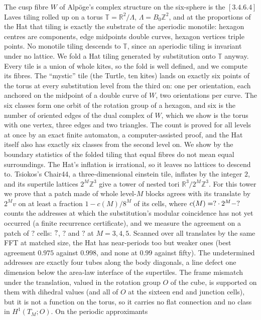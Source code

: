 \documentclass[11pt,a4paper]{article}
\newcommand{\SSChAgreeFive}{?}\newcommand{\SSChAgreeFour}{?}
\newcommand{\SSChCConst}{?}\newcommand{\SSChChecks}{?}
\newcommand{\SSChPatchCells}{?}\newcommand{\SSChRowAddr}{?}
\newcommand{\ZZ}{\mathbb{Z}}
\newcommand{\RR}{\mathbb{R}}
\newcommand{\TT}{\mathbb{T}}
\newcommand{\Lam}{\Lambda}
\theoremstyle{plain}
\theoremstyle{definition}
\begin{document}
The cusp fibre $W$ of Alpöge's complex structure on the six-sphere is the
$[3.4.6.4]$ Laves tiling rolled up on a torus $\TT = \RR^2/\Lam$,
$\Lam = B_0\ZZ^2$, and at the proportions of the Hat that tiling is exactly the
substrate of the aperiodic monotile: hexagon centres are components, edge
midpoints double curves, hexagon vertices triple points. No monotile tiling
descends to $\TT$, since an aperiodic tiling is invariant under no lattice. We
fold a Hat tiling generated by substitution onto $\TT$ anyway. Every tile is a
union of whole kites, so the fold is well defined, and we compute its fibres.
The ``mystic'' tile (the Turtle, ten kites) lands on exactly six points of
the torus at every substitution level from the third on: one per
orientation, each anchored on the midpoint of a double curve of $W$, two
orientations per curve. The six classes form one orbit of the rotation group of
a hexagon, and six is the number of oriented edges of the dual complex of $W$,
which we show is the torus with one vertex, three edges and two triangles. The
count is proved for all levels at once by an exact finite automaton, a
computer-assisted proof, and the Hat itself also has exactly six classes from the
second level on. We show by the boundary statistics of the folded tiling that
equal fibres do not mean equal surroundings. The Hat's inflation is irrational, so it leaves no lattices to descend to.
Tsiokos's Chair44, a three-dimensional einstein tile, inflates by the integer $2$, and
its supertile lattices $2^M\ZZ^3$ give a tower of nested tori $\RR^3/2^M\ZZ^3$. For this
tower we prove that a patch made of whole level-$M$ blocks agrees with its translate by
$2^Mv$ on at least a fraction $1-c(M)/8^M$ of its cells, where
$c(M)=\SSChCCoef\cdot2^M-\SSChCConst$ counts the addresses at which the substitution's
modular coincidence has not yet occurred (a finite recurrence certificate), and we measure
the agreement on a patch of $\SSChPatchCells$ cells: $?$, $\SSChAgreeFour$ and
$\SSChAgreeFive$ at $M=3,4,5$. Scanned over all translates by the same FFT at matched
size, the Hat has near-periods too but weaker ones (best agreement $0.975$ against
$0.998$, and none at $0.99$ against fifty). The undetermined addresses are exactly four tubes along the body
diagonals, a line defect one dimension below the area-law interface of the supertiles. The frame mismatch under the
translation, valued in the rotation group $O$ of the cube, is supported on them with dihedral values (and all of $O$ at the sixteen end and junction cells), but
it is not a function on the torus, so it carries no flat connection and no class in $H^1(T_M;O)$. On the periodic approximants
\end{document}
